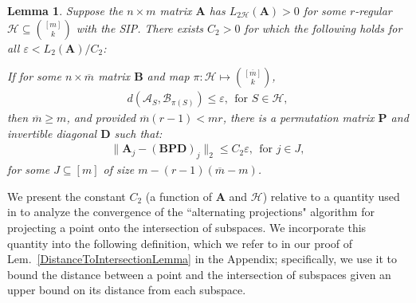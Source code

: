 \documentclass[journal, twocolumn]{IEEEtran}
\newtheorem{lemma}{Lemma}
\begin{document}
\begin{lemma}\label{MainLemma}
Suppose the $n \times m$ matrix $\mathbf{A}$ has $L_{2\mathcal{H}}(\mathbf{A}) > 0$ for some $r$-regular $\mathcal{H} \subseteq {[m] \choose k}$ with the SIP. There exists $C_2 > 0$ for which the following holds for all $\varepsilon < L_2(\mathbf{A}) / C_2$:

If for some $n \times \overline m$ matrix $\mathbf{B}$ and map $\pi: \mathcal{H} \mapsto {[\overline m] \choose k}$,
\begin{align}\label{GapUpperBound}
d(\bm{\mathcal{A}}_S, \bm{\mathcal{B}}_{\pi(S)}) \leq \varepsilon, \ \  \text{for $S \in \mathcal{H}$},
\end{align}
then $\overline m \geq m$, and provided $\overline m (r-1) < mr$, there is a permutation matrix $\mathbf{P}$ and invertible diagonal $\mathbf{D}$ such that:
\begin{align}\label{MainLemmaBPD}
\|\mathbf{A}_j - (\mathbf{B}\mathbf{PD})_j\|_2 \leq C_2 \varepsilon, \ \  \text{for } j \in J,
\end{align}
for some $J \subseteq [m]$ of size \mbox{$m - (r-1)(\overline m - m)$}.
\end{lemma}



We present the constant $C_2$ (a function of $\mathbf{A}$ and $\mathcal{H}$) relative to a quantity used in \cite{Deutsch12} to analyze the convergence of the ``alternating projections" algorithm for projecting a point onto the intersection of subspaces. We incorporate this quantity into the following definition, which we refer to in our proof of Lem.~\ref{DistanceToIntersectionLemma} in the Appendix; specifically, we use it to bound the distance between a point and the intersection of subspaces given an upper bound on its distance from each subspace.
\end{document}
